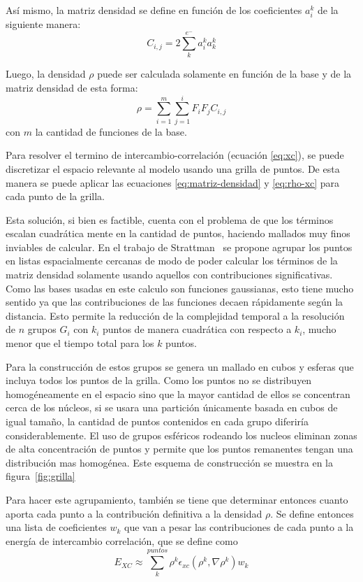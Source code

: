 As\'i mismo, la matriz densidad se define en funci\'on de los coeficientes $a^k_i$ de la siguiente manera:
\begin{equation}
  \label{eq:matriz-densidad}
  C_{i,j} = 2 \sum^{e^{-}}_k a^k_i a^k_k
\end{equation}

Luego, la densidad $\rho$ puede ser calculada solamente en funci\'on de la base y de la matriz densidad de esta forma:
\begin{equation}
  \label{eq:rho-xc}
  \rho = \sum^m_{i=1} \sum^i_{j=1} F_i F_j C_{i,j}
\end{equation}
con $m$ la cantidad de funciones de la base.

Para resolver el termino de intercambio-correlaci\'on (ecuaci\'on \ref{eq:xc}), se puede discretizar el espacio relevante al
modelo usando una grilla de puntos. De esta manera se puede aplicar las ecuaciones \ref{eq:matriz-densidad} y \ref{eq:rho-xc}
para cada punto de la grilla.

Esta soluci\'on, si bien es factible, cuenta con el problema de que los t\'erminos escalan cuadr\'atica mente
en la cantidad de puntos, haciendo mallados muy finos inviables de calcular. En el trabajo de Strattman~\cite{Stratmann} se
propone agrupar los puntos en listas espacialmente cercanas de modo de poder calcular los t\'erminos de la matriz densidad
solamente usando aquellos con contribuciones significativas. Como las bases usadas en este calculo son funciones gaussianas,
esto tiene mucho sentido ya que las contribuciones de las funciones decaen r\'apidamente seg\'un la distancia. Esto permite
la reducci\'on de la complejidad temporal a la resoluci\'on de $n$ grupos $G_i$ con $k_i$ puntos de manera cuadr\'atica con respecto a $k_i$,
mucho menor que el tiempo total para los $k$ puntos.

Para la construcci\'on de estos grupos se genera un mallado en cubos y esferas que incluya todos los puntos
de la grilla. Como los puntos no se distribuyen homog\'eneamente en el espacio sino que la mayor cantidad de ellos
se concentran cerca de los n\'ucleos, si se usara una partici\'on \'unicamente basada en cubos de igual tama\~no, la cantidad
de puntos contenidos en cada grupo diferir\'ia considerablemente. El uso de grupos esf\'ericos rodeando
los nucleos eliminan zonas de alta concentraci\'on de puntos y permite que los puntos remanentes
tengan una distribuci\'on mas homog\'enea. Este esquema de construcci\'on se muestra en la figura~\ref{fig:grilla}


Para hacer este agrupamiento, tambi\'en se tiene que determinar entonces cuanto aporta cada punto a la contribuci\'on definitiva
a la densidad $\rho$. Se define entonces una lista de coeficientes $w_k$ que van a pesar las contribuciones de cada punto
a la energ\'ia de intercambio correlaci\'on, que se define como
\begin{equation}
  E_{XC} \approx \sum^{puntos}_k \rho^k \epsilon_{xc} (\rho^k,\nabla \rho^k) w_k
\end{equation}

